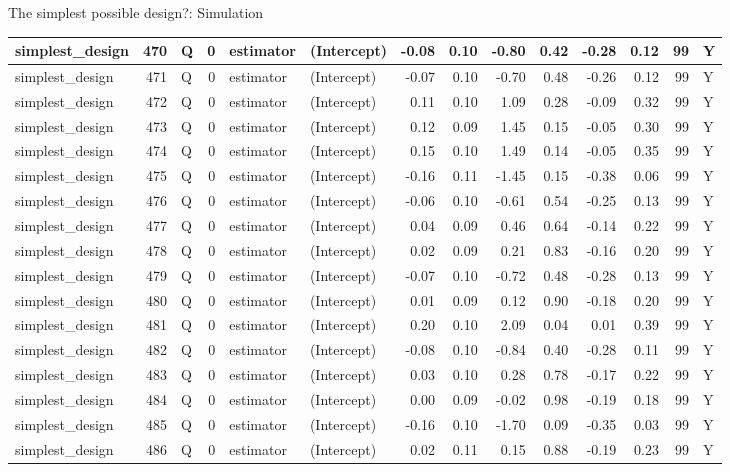\documentclass[
  11pt,
  ignorenonframetext,
]{beamer}
\begin{document}
\begin{frame}[fragile]{The simplest possible design?: Simulation}
\begin{tabular}{l|r|l|r|l|l|r|r|r|r|r|r|r|l}
\hline
simplest\_design & 470 & Q & 0 & estimator & (Intercept) & -0.08 & 0.10 & -0.80 & 0.42 & -0.28 & 0.12 & 99 & Y\\
\hline
simplest\_design & 471 & Q & 0 & estimator & (Intercept) & -0.07 & 0.10 & -0.70 & 0.48 & -0.26 & 0.12 & 99 & Y\\
\hline
simplest\_design & 472 & Q & 0 & estimator & (Intercept) & 0.11 & 0.10 & 1.09 & 0.28 & -0.09 & 0.32 & 99 & Y\\
\hline
simplest\_design & 473 & Q & 0 & estimator & (Intercept) & 0.12 & 0.09 & 1.45 & 0.15 & -0.05 & 0.30 & 99 & Y\\
\hline
simplest\_design & 474 & Q & 0 & estimator & (Intercept) & 0.15 & 0.10 & 1.49 & 0.14 & -0.05 & 0.35 & 99 & Y\\
\hline
simplest\_design & 475 & Q & 0 & estimator & (Intercept) & -0.16 & 0.11 & -1.45 & 0.15 & -0.38 & 0.06 & 99 & Y\\
\hline
simplest\_design & 476 & Q & 0 & estimator & (Intercept) & -0.06 & 0.10 & -0.61 & 0.54 & -0.25 & 0.13 & 99 & Y\\
\hline
simplest\_design & 477 & Q & 0 & estimator & (Intercept) & 0.04 & 0.09 & 0.46 & 0.64 & -0.14 & 0.22 & 99 & Y\\
\hline
simplest\_design & 478 & Q & 0 & estimator & (Intercept) & 0.02 & 0.09 & 0.21 & 0.83 & -0.16 & 0.20 & 99 & Y\\
\hline
simplest\_design & 479 & Q & 0 & estimator & (Intercept) & -0.07 & 0.10 & -0.72 & 0.48 & -0.28 & 0.13 & 99 & Y\\
\hline
simplest\_design & 480 & Q & 0 & estimator & (Intercept) & 0.01 & 0.09 & 0.12 & 0.90 & -0.18 & 0.20 & 99 & Y\\
\hline
simplest\_design & 481 & Q & 0 & estimator & (Intercept) & 0.20 & 0.10 & 2.09 & 0.04 & 0.01 & 0.39 & 99 & Y\\
\hline
simplest\_design & 482 & Q & 0 & estimator & (Intercept) & -0.08 & 0.10 & -0.84 & 0.40 & -0.28 & 0.11 & 99 & Y\\
\hline
simplest\_design & 483 & Q & 0 & estimator & (Intercept) & 0.03 & 0.10 & 0.28 & 0.78 & -0.17 & 0.22 & 99 & Y\\
\hline
simplest\_design & 484 & Q & 0 & estimator & (Intercept) & 0.00 & 0.09 & -0.02 & 0.98 & -0.19 & 0.18 & 99 & Y\\
\hline
simplest\_design & 485 & Q & 0 & estimator & (Intercept) & -0.16 & 0.10 & -1.70 & 0.09 & -0.35 & 0.03 & 99 & Y\\
\hline
simplest\_design & 486 & Q & 0 & estimator & (Intercept) & 0.02 & 0.11 & 0.15 & 0.88 & -0.19 & 0.23 & 99 & Y\\

\end{tabular}
\end{frame}
\end{document}
